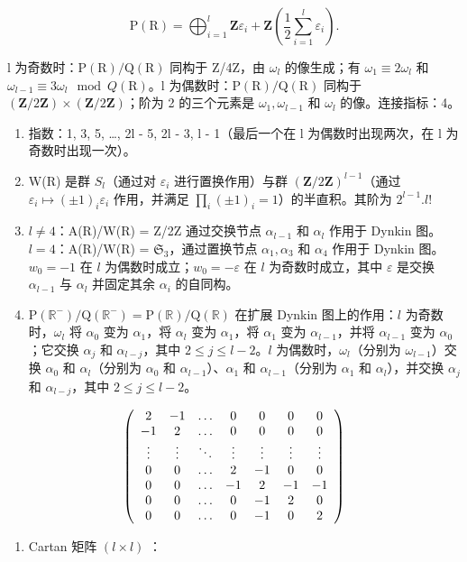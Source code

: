 \[
\mathrm{P} (\mathrm{R}) = \bigoplus_ {i = 1} ^ {l} \mathbf {Z} \varepsilon_ {i} + \mathbf {Z} \left(\frac {1}{2} \sum_ {i = 1} ^ {l} \varepsilon_ {i}\right).
\]

l 为奇数时：\(\mathrm{P}(\mathrm{R})/\mathrm{Q}(\mathrm{R})\) 同构于 Z/4Z，由 \(\omega_{l}\) 的像生成；有 \(\omega_{1} \equiv 2\omega_{l}\) 和 \(\omega_{l-1} \equiv 3\omega_{l} \mod Q(\mathrm{R})\)。l 为偶数时：\(\mathrm{P}(\mathrm{R})/\mathrm{Q}(\mathrm{R})\) 同构于 \((\mathbf{Z}/2\mathbf{Z}) \times (\mathbf{Z}/2\mathbf{Z})\)；阶为 2 的三个元素是 \(\omega_{1}, \omega_{l-1}\) 和 \(\omega_{l}\) 的像。连接指标：4。

\begin{enumerate}
\def\labelenumi{(\Roman{enumi})}
\setcounter{enumi}{8}
\item
  指数：1, 3, 5, \ldots, 2l - 5, 2l - 3, l - 1（最后一个在 l 为偶数时出现两次，在 l 为奇数时出现一次）。
\item
  W(R) 是群 \(S_{l}\)（通过对 \(\varepsilon_{i}\) 进行置换作用）与群 \((\mathbf{Z}/2\mathbf{Z})^{l-1}\)（通过 \(\varepsilon_{i} \mapsto (\pm1)_{i}\varepsilon_{i}\) 作用，并满足 \(\prod_{i}(\pm1)_{i} = 1\)）的半直积。其阶为 \(2^{l-1}.l!\)
\item
  \(l \neq 4\)：A(R)/W(R) = Z/2Z 通过交换节点 \(\alpha_{l-1}\) 和 \(\alpha_l\) 作用于 Dynkin 图。\(l = 4\)：A(R)/W(R) = \(\mathfrak{S}_3\)，通过置换节点 \(\alpha_1, \alpha_3\) 和 \(\alpha_4\) 作用于 Dynkin 图。\(w_0 = -1\) 在 \(l\) 为偶数时成立；\(w_0 = -\varepsilon\) 在 \(l\) 为奇数时成立，其中 \(\varepsilon\) 是交换 \(\alpha_{l-1}\) 与 \(\alpha_l\) 并固定其余 \(\alpha_i\) 的自同构。
\item
  \(\mathrm{P}(\mathbb{R}^{-}) / \mathrm{Q}(\mathbb{R}^{-}) = \mathrm{P}(\mathbb{R}) / \mathrm{Q}(\mathbb{R})\) 在扩展 Dynkin 图上的作用：\(l\) 为奇数时，\(\omega_l\) 将 \(\alpha_0\) 变为 \(\alpha_1\)，将 \(\alpha_l\) 变为 \(\alpha_1\)，将 \(\alpha_1\) 变为 \(\alpha_{l-1}\)，并将 \(\alpha_{l-1}\) 变为 \(\alpha_0\)；它交换 \(\alpha_j\) 和 \(\alpha_{l-j}\)，其中 \(2 \leqslant j \leqslant l - 2\)。\(l\) 为偶数时，\(\omega_l\)（分别为 \(\omega_{l-1}\)）交换 \(\alpha_0\) 和 \(\alpha_l\)（分别为 \(\alpha_0\) 和 \(\alpha_{l-1}\)）、\(\alpha_1\) 和 \(\alpha_{l-1}\)（分别为 \(\alpha_1\) 和 \(\alpha_l\)），并交换 \(\alpha_j\) 和 \(\alpha_{l-j}\)，其中 \(2 \leqslant j \leqslant l - 2\)。
\end{enumerate}

\[
\left( \begin{array}{c c c c c c c} 2 & - 1 & \dots & 0 & 0 & 0 & 0 \\ - 1 & 2 & \dots & 0 & 0 & 0 & 0 \\ \vdots & \vdots & \ddots & \vdots & \vdots & \vdots & \vdots \\ 0 & 0 & \dots & 2 & - 1 & 0 & 0 \\ 0 & 0 & \dots & - 1 & 2 & - 1 & - 1 \\ 0 & 0 & \dots & 0 & - 1 & 2 & 0 \\ 0 & 0 & \dots & 0 & - 1 & 0 & 2 \end{array} \right)
\]

\begin{enumerate}
\def\labelenumi{(\Roman{enumi})}
\setcounter{enumi}{12}
\tightlist
\item
  Cartan 矩阵 \((l\times l)\) ：
\end{enumerate}

